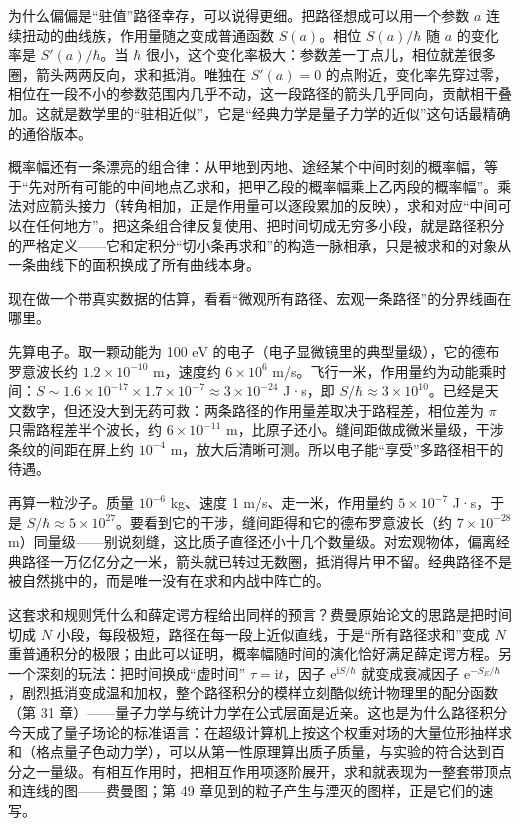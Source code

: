 \begin{mathbridge}
为什么偏偏是“驻值”路径幸存，可以说得更细。把路径想成可以用一个参数 \(a\) 连续扭动的曲线族，作用量随之变成普通函数 \(S(a)\)。相位 \(S(a)/\hbar\) 随 \(a\) 的变化率是 \(S'(a)/\hbar\)。当 \(\hbar\) 很小，这个变化率极大：参数差一丁点儿，相位就差很多圈，箭头两两反向，求和抵消。唯独在 \(S'(a)=0\) 的点附近，变化率先穿过零，相位在一段不小的参数范围内几乎不动，这一段路径的箭头几乎同向，贡献相干叠加。这就是数学里的“驻相近似”，它是“经典力学是量子力学的近似”这句话最精确的通俗版本。

概率幅还有一条漂亮的组合律：从甲地到丙地、途经某个中间时刻的概率幅，等于“先对所有可能的中间地点乙求和，把甲乙段的概率幅乘上乙丙段的概率幅”。乘法对应箭头接力（转角相加，正是作用量可以逐段累加的反映），求和对应“中间可以在任何地方”。把这条组合律反复使用、把时间切成无穷多小段，就是路径积分的严格定义——它和定积分“切小条再求和”的构造一脉相承，只是被求和的对象从一条曲线下的面积换成了所有曲线本身。
\end{mathbridge}

现在做一个带真实数据的估算，看看“微观所有路径、宏观一条路径”的分界线画在哪里。

先算电子。取一颗动能为 100 eV 的电子（电子显微镜里的典型量级），它的德布罗意波长约 \(1.2\times10^{-10}\) m，速度约 \(6\times10^{6}\) m/s。飞行一米，作用量约为动能乘时间：\(S\sim 1.6\times10^{-17}\times1.7\times10^{-7}\approx3\times10^{-24}\) J·s，即 \(S/\hbar\approx3\times10^{10}\)。已经是天文数字，但还没大到无药可救：两条路径的作用量差取决于路程差，相位差为 \(\pi\) 只需路程差半个波长，约 \(6\times10^{-11}\) m，比原子还小。缝间距做成微米量级，干涉条纹的间距在屏上约 \(10^{-4}\) m，放大后清晰可测。所以电子能“享受”多路径相干的待遇。

再算一粒沙子。质量 \(10^{-6}\) kg、速度 1 m/s、走一米，作用量约 \(5\times10^{-7}\) J·s，于是 \(S/\hbar\approx5\times10^{27}\)。要看到它的干涉，缝间距得和它的德布罗意波长（约 \(7\times10^{-28}\) m）同量级——别说刻缝，这比质子直径还小十几个数量级。对宏观物体，偏离经典路径一万亿亿分之一米，箭头就已转过无数圈，抵消得片甲不留。经典路径不是被自然挑中的，而是唯一没有在求和内战中阵亡的。

\begin{challenge}
这套求和规则凭什么和薛定谔方程给出同样的预言？费曼原始论文的思路是把时间切成 \(N\) 小段，每段极短，路径在每一段上近似直线，于是“所有路径求和”变成 \(N\) 重普通积分的极限；由此可以证明，概率幅随时间的演化恰好满足薛定谔方程。另一个深刻的玩法：把时间换成“虚时间” \(\tau=\mathrm{i}t\)，因子 \(\mathrm{e}^{\mathrm{i}S/\hbar}\) 就变成衰减因子 \(\mathrm{e}^{-S_E/\hbar}\)，剧烈抵消变成温和加权，整个路径积分的模样立刻酷似统计物理里的配分函数（第 31 章）——量子力学与统计力学在公式层面是近亲。这也是为什么路径积分今天成了量子场论的标准语言：在超级计算机上按这个权重对场的大量位形抽样求和（格点量子色动力学），可以从第一性原理算出质子质量，与实验的符合达到百分之一量级。有相互作用时，把相互作用项逐阶展开，求和就表现为一整套带顶点和连线的图——费曼图；第 49 章见到的粒子产生与湮灭的图样，正是它们的速写。
\end{challenge}

